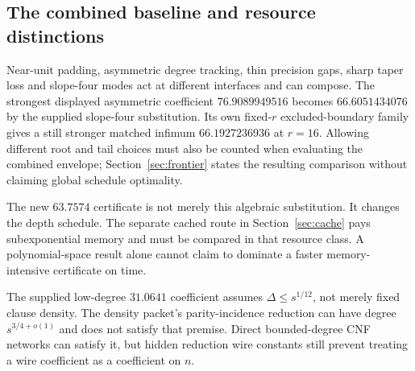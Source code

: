 \subsection{The combined baseline and resource distinctions}
Near-unit padding, asymmetric degree tracking, thin precision gaps, sharp taper loss and slope-four modes act at different interfaces and can compose. The strongest displayed asymmetric coefficient $76.9089949516$ becomes $66.6051434076$ by the supplied slope-four substitution. Its own fixed-$r$ excluded-boundary family gives a still stronger matched infimum $66.1927236936$ at $r=16$. Allowing different root and tail choices must also be counted when evaluating the combined envelope; Section~\ref{sec:frontier} states the resulting comparison without claiming global schedule optimality.

The new $63.7574$ certificate is not merely this algebraic substitution. It changes the depth schedule. The separate cached route in Section~\ref{sec:cache} pays subexponential memory and must be compared in that resource class. A polynomial-space result alone cannot claim to dominate a faster memory-intensive certificate on time.

The supplied low-degree $31.0641$ coefficient assumes $\Delta\le s^{1/12}$, not merely fixed clause density. The density packet's parity-incidence reduction can have degree $s^{3/4+o(1)}$ and does not satisfy that premise. Direct bounded-degree CNF networks can satisfy it, but hidden reduction wire constants still prevent treating a wire coefficient as a coefficient on $n$.
